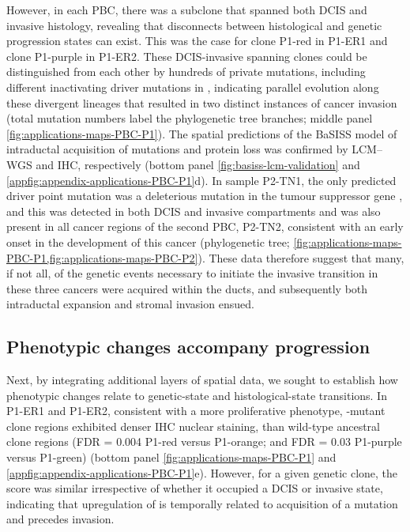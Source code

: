 However, in each \ac{PBC}, there was a subclone that spanned both \ac{DCIS} and invasive histology, revealing that disconnects between histological and genetic progression states can exist. This was the case for clone P1-red in P1-ER1 and clone P1-purple in P1-ER2. These \ac{DCIS}-invasive spanning clones could be distinguished from each other by hundreds of private mutations, including different inactivating driver mutations in , indicating parallel evolution along these divergent lineages that resulted in two distinct instances of cancer invasion (total mutation numbers label the phylogenetic tree branches; middle panel \cref{fig:applications-maps-PBC-P1}). The spatial predictions of the \ac{BaSISS} model of intraductal acquisition of  mutations and  protein loss was confirmed by \ac{LCM}–\ac{WGS} and \ac{IHC}, respectively (bottom panel \cref{fig:basiss-lcm-validation} and \cref{appfig:appendix-applications-PBC-P1}d). In sample P2-TN1, the only predicted driver point mutation was a deleterious mutation in the tumour suppressor gene , and this was detected in both \ac{DCIS} and invasive compartments and was also present in all cancer regions of the second \ac{PBC}, P2-TN2, consistent with an early onset in the development of this cancer (phylogenetic tree; \cref{fig:applications-maps-PBC-P1,fig:applications-maps-PBC-P2}). These data therefore suggest that many, if not all, of the genetic events necessary to initiate the invasive transition in these three cancers were acquired within the ducts, and subsequently both intraductal expansion and stromal invasion ensued.

\subsection{Phenotypic changes accompany progression}

Next, by integrating additional layers of spatial data, we sought to establish how phenotypic changes relate to genetic-state and histological-state transitions. In P1-ER1 and P1-ER2, consistent with a more proliferative phenotype, -mutant clone regions exhibited denser  \ac{IHC} nuclear staining, than  wild-type ancestral clone regions (\ac{FDR} = 0.004 P1-red versus P1-orange; and \ac{FDR} = 0.03 P1-purple versus P1-green) (bottom panel \cref{fig:applications-maps-PBC-P1} and \cref{appfig:appendix-applications-PBC-P1}e). However, for a given genetic clone, the  score was similar irrespective of whether it occupied a \ac{DCIS} or invasive state, indicating that upregulation of  is temporally related to acquisition of a  mutation and precedes invasion.

